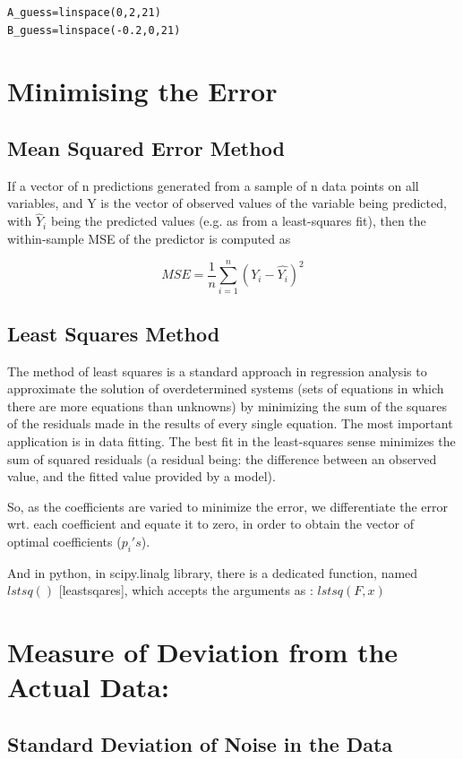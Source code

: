 \documentclass[10pt,english, openany]{book}
\begin{document}
\begin{verbatim}
A_guess=linspace(0,2,21)
B_guess=linspace(-0.2,0,21)
\end{verbatim}

\section{Minimising the Error}
 {\subsection{Mean Squared Error Method}} 
If a vector of n predictions generated from a sample of n data points on all variables, and Y is the vector of observed values of the variable being predicted, with $\hat Y_i$ being the predicted values (e.g. as from a least-squares fit), then the within-sample MSE of the predictor is computed as\par

$$ MSE = \frac{1}{n}\sum_{i=1}^{n} (Y_{i}-\hat{Y_{i}})^2$$

\subsection{Least Squares Method}
The method of least squares is a standard approach in regression analysis to approximate the solution of overdetermined systems (sets of equations in which there are more equations than unknowns) by minimizing the sum of the squares of the residuals made in the results of every single equation.
The most important application is in data fitting. The best fit in the least-squares sense minimizes the sum of squared residuals (a residual being: the difference between an observed value, and the fitted value provided by a model).\par
So, as the coefficients are varied to minimize the error, we differentiate the error wrt. each coefficient and equate it to zero, in order to obtain the vector of optimal coefficients ($p_i 's$).\par
And in python, in scipy.linalg library, there is a dedicated function, named $lstsq()$ [leastsqares], which accepts the arguments as : $lstsq(F,x)$

\section{Measure of Deviation from the Actual Data:}
\subsection{Standard Deviation of Noise in the Data}
\end{document}
